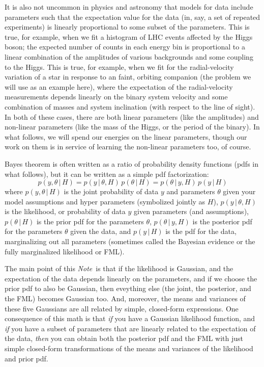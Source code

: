 \documentclass[12pt, letterpaper]{article}
\newcommand{\documentname}{\textsl{Note}}
\newcommand{\acronym}[1]{\small{#1}}
\newcommand{\FML}{\acronym{FML}}
\newcommand{\given}{\,|\,}
\begin{document}
It is also not uncommon in physics and astronomy that models for data
include parameters such that the expectation value for the data (in,
say, a set of repeated experiments) is linearly proportional to some
subset of the parameters.
This is true, for example, when we fit a histogram of LHC events
affected by the Higgs boson; the expected number of counts in each
energy bin is proportional to a linear combination of the amplitudes
of various backgrounds and some coupling to the Higgs.
This is true, for example, when we fit for the radial-velocity
variation of a star in response to an faint, orbiting companion (the
problem we will use as an example here), where the expectation of the
radial-velocity measurements depends linearly on the binary system
velocity and some combination of masses and system inclination (with
respect to the line of sight).
In both of these cases, there are both linear parameters (like the
amplitudes) and non-linear parameters (like the mass of the Higgs, or
the period of the binary).
In what follows, we will spend our energies on the linear parameters,
though our work on them is in service of learning the non-linear
parameters too, of course.

Bayes theorem is often written as a ratio of probability density
functions (pdfs in what follows), but it can be written as a simple
pdf factorization:
\begin{equation}
p(y,\theta\given H) = p(y\given\theta,H)\,p(\theta\given H) = p(\theta\given y,H)\,p(y\given H)
\end{equation}
where
$p(y,\theta\given H)$ is the joint probability of data $y$ and
parameters $\theta$ given your model assumptions and hyper parameters
(symbolized jointly as $H$),
$p(y\given\theta,H)$ is the likelihood, or probability of data $y$
given parameters (and assumptions),
$p(\theta\given H)$ is the prior pdf for the parameters $\theta$,
$p(\theta\given y,H)$ is the posterior pdf for the parameters $\theta$
given the data,
and
$p(y\given H)$ is the pdf for the data, marginalizing out all
parameters (sometimes called the Bayesian evidence or the fully
marginalized likelihood or \FML).

The main point of this \documentname\ is that if the likelihood is
Gaussian, and the expectation of the data depends linearly on the
parameters, and if we choose the prior pdf to also be Gaussian, then
eveything else (the joint, the posterior, and the \FML) becomes
Gaussian too.
And, moreover, the means and variances of these five Gaussians are all
related by simple, closed-form expressions.
One consequence of this math is that \emph{if} you have a Gaussian
likelihood function, and \emph{if} you have a subset of parameters
that are linearly related to the expectation of the data, \emph{then}
you can obtain both the posterior pdf and the FML with just simple
closed-form transformations of the means and variances of the
likelihood and prior pdf.
\end{document}
